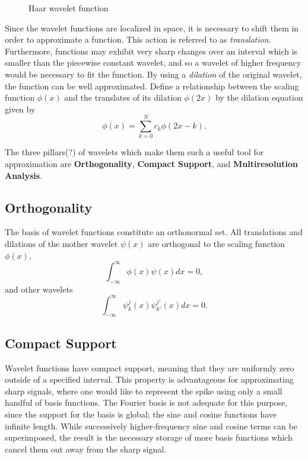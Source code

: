\documentclass[11pt]{article}
\begin{document}
\begin{figure}[H]
	\centering
	
	\caption{Haar wavelet function}
	\label{fig:haar_wavelet}
\end{figure}
Since the wavelet functions are localized in space, it is necessary to shift them in order to approximate
a function. This action is referred to as \textit{translation}. Furthermore, functions may exhibit very sharp changes over an
interval which is smaller than the piecewise constant wavelet, and so a wavelet of higher frequency would be necessary
to fit the function. By using a \textit{dilation} of the original wavelet, the function can be well approximated. 
Define a relationship between the scaling function $\phi(x)$ and the translates of its dilation 
$\phi(2x)$ by the dilation equation given by
\begin{equation}
\phi(x) = \sum_{k=0}^{N} c_k \phi(2x-k).
\label{dilation equation}
\end{equation}

The three pillars(?) of wavelets which make them such a useful tool for approximation are \textbf{Orthogonality}, \textbf{Compact Support}, and \textbf{Multiresolution Analysis}.
\subsection{Orthogonality}
The basis of wavelet functions constitute an orthonormal set. All translations and dilations of the mother wavelet $\psi(x)$
are orthogonal to the scaling function $\phi(x)$, 
\begin{equation}
\int_{-\infty}^{\infty} \phi(x) \psi(x) dx = 0,
\end{equation}
and other wavelets
\begin{equation}
\int_{-\infty}^{\infty} \psi_{k}^{j}(x) \psi_{k'}^{j'}(x) dx = 0.
\end{equation}
\subsection{Compact Support}
Wavelet functions have compact support, meaning that they are uniformly zero outside of a specified interval.
This property is advantageous for approximating sharp signals, where one would like to represent the spike using only a small 
handful of basis functions. The Fourier basis is not adequate for this purpose, since the support for the basis is global; 
the sine and cosine functions have infinite length. While successively higher-frequency sine and cosine terms 
can be superimposed, the result is the necessary storage of more basis functions which cancel them out away
from the sharp signal. 
\end{document}
